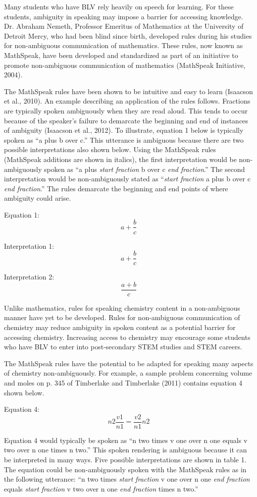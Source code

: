 \documentclass[11.5pt]{sig-alternate} %
\begin{document}
\begin{large}
Many students who have BLV rely heavily on speech for learning. For these students, ambiguity in speaking may impose a barrier for accessing knowledge. Dr. Abraham Nemeth, Professor Emeritus of Mathematics at the University of Detroit Mercy, who had been blind since birth, developed rules during his studies for non-ambiguous communication of mathematics. These rules, now known as MathSpeak, have been developed and standardized as part of an initiative to promote non-ambiguous communication of mathematics (MathSpeak Initiative, 2004). 

The MathSpeak rules have been shown to be intuitive and easy to learn (Isaacson et al., 2010). An example describing an application of the rules follows. Fractions are typically spoken ambiguously when they are read aloud. This tends to occur because of the speaker's failure to demarcate the beginning and end of instances of ambiguity (Isaacson et al., 2012). To illustrate, equation 1 below is typically spoken as ``a plus b over c.'' This utterance is ambiguous because there are two possible interpretations also shown below. Using the MathSpeak rules (MathSpeak additions are shown in italics), the first interpretation would be non-ambiguously spoken as ``a plus \textit{start fraction} b over c \textit{end fraction}.'' The second interpretation would be non-ambiguously stated as ``\textit{start fraction} a plus b over c \textit{end fraction}.'' The rules demarcate the beginning and end points of where ambiguity could arise.

Equation 1:
\[ a + \dfrac{b}{c}\]

Interpretation 1:
\[ a + \dfrac{b}{c}\]

Interpretation 2:
\[ \dfrac{a + b}{c}\]

Unlike mathematics, rules for speaking chemistry content in a non-ambiguous manner have yet to be developed. Rules for non-ambiguous communication of chemistry may reduce ambiguity in spoken content as a potential barrier for accessing chemistry. Increasing access to chemistry may encourage some students who have BLV to enter into post-secondary STEM studies and STEM careers.

The MathSpeak rules have the potential to be adapted for speaking many aspects of chemistry non-ambiguously. For example, a sample problem concerning volume and moles on p. 345 of Timberlake and Timberlake (2011) contains equation 4 shown below. 

Equation 4:
\[n2 \dfrac{v1}{n1} = \dfrac{v2}{n1}n2\]

Equation 4 would typically be spoken as ``n two times v one over n one equals v two over n one times n two.'' This spoken rendering is ambiguous because it can be interpreted in many ways. Five possible interpretations are shown in table 1. The equation could be non-ambiguously spoken with the MathSpeak rules as in the following utterance: ``n two times \textit{start fraction} v one over n one \textit{end fraction} equals \textit{start fraction} v two over n one \textit{end fraction} times n two.''


\end{large}
\end{document}
